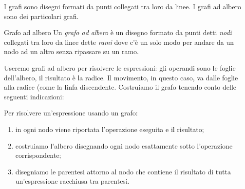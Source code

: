I grafi sono disegni formati da punti collegati tra loro da linee. 
I grafi ad albero sono dei particolari grafi.

\begin{definizione}{Grafo ad albero}{}
Un \emph{grafo ad albero} è un disegno formato da punti detti \emph{nodi} 
collegati tra loro da linee dette \emph{rami} dove c'è un solo modo per 
andare da un nodo ad un altro senza ripassare su un ramo.
\end{definizione}


Useremo grafi ad albero per risolvere le espressioni:
gli operandi sono le foglie dell'albero, il risultato è la radice. 
Il movimento, in questo caso, va dalle foglie alla radice (come la linfa 
discendente.
Costruiamo il grafo tenendo conto delle seguenti indicazioni:

\begin{procedura}{}{}
 Per risolvere un'espressione usando un grafo:
\begin{enumerate} [noitemsep]
 \item in ogni nodo viene riportata l'operazione eseguita e il risultato;
 \item costruiamo l'albero disegnando ogni nodo esattamente sotto
  l'operazione corrispondente;
 \item disegniamo le parentesi attorno al nodo che contiene il
  risultato di tutta un'espressione racchiusa tra parentesi.
\end{enumerate}
\end{procedura}


